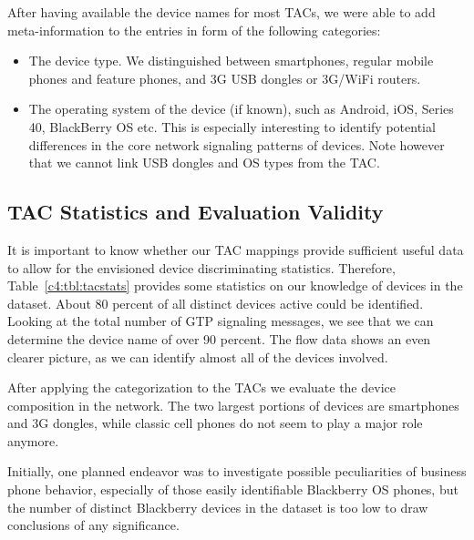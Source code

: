 After having available the device names for most \glspl{TAC}, we were able to add meta-information to the entries in form of the following categories:

\begin{itemize}
\item The device type. We distinguished between smartphones, regular mobile phones and feature phones, and 3G USB dongles or 3G/WiFi routers.

\item The operating system of the device (if known), such as Android, iOS, Series 40, BlackBerry OS etc. This is especially interesting to identify potential differences in the core network signaling patterns of devices. Note however that we cannot link USB dongles and OS types from the \gls{TAC}.

\end{itemize}



\subsection{TAC Statistics and Evaluation Validity}

It is important to know whether our \gls{TAC} mappings provide sufficient useful data to allow for the envisioned device discriminating statistics. Therefore, Table~\ref{c4:tbl:tacstats} provides some statistics on our knowledge of devices in the dataset. About 80 percent of all  distinct devices active could be identified. Looking at the total number of \gls{GTP} signaling messages, we see that we can determine the device name of over 90 percent.
The flow data shows an even clearer picture, as we can identify almost all of the devices involved.


After applying the categorization to the \glspl{TAC} we evaluate the device composition in the network. The two largest portions of devices are smartphones  and 3G dongles, while classic cell phones do not seem to play a major role anymore. 


Initially, one planned endeavor was to investigate possible peculiarities of business phone behavior, especially of those easily identifiable Blackberry OS phones, but the number of distinct Blackberry devices in the dataset is too low to draw conclusions of any significance.


